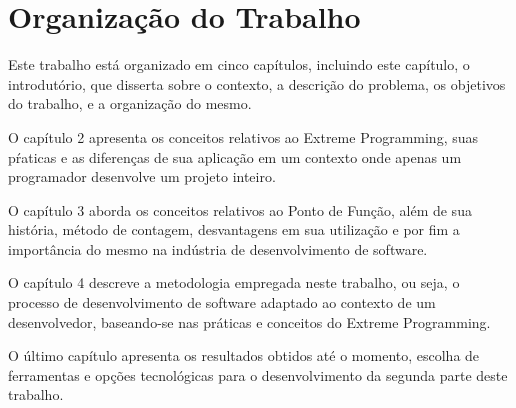 \section{Organização do Trabalho}

Este trabalho está organizado em cinco capítulos, incluindo este capítulo, o
introdutório, que disserta sobre o contexto, a descrição do problema, os
objetivos do trabalho, e a organização do mesmo.

O capítulo 2 apresenta os conceitos relativos ao Extreme Programming, suas
pŕaticas e as diferenças de sua aplicação em um contexto onde apenas um
programador desenvolve um projeto inteiro.

O capítulo 3 aborda os conceitos relativos ao Ponto de Função, além de sua história, método de contagem, desvantagens em sua utilização e por fim  a
importância do mesmo na indústria de desenvolvimento de software.

O capítulo 4 descreve a metodologia empregada neste trabalho, ou seja,
o processo de desenvolvimento de software adaptado ao contexto de um
desenvolvedor, baseando-se nas práticas e conceitos do Extreme Programming.

O último capítulo apresenta os resultados obtidos até o momento, escolha de
ferramentas e opções tecnológicas para o desenvolvimento da segunda parte deste
trabalho.
